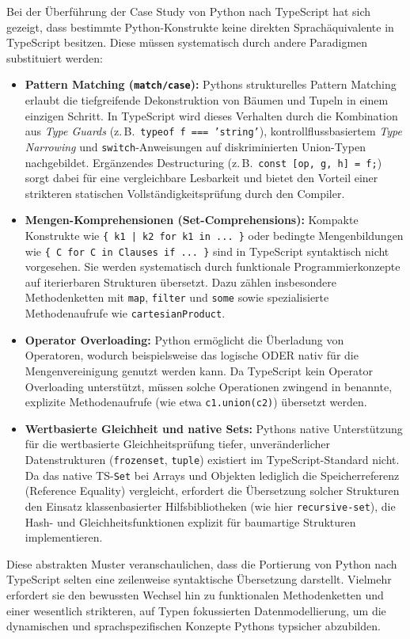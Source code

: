 Bei der Überführung der Case Study von Python nach TypeScript hat sich gezeigt, dass bestimmte Python-Konstrukte keine direkten Sprachäquivalente in TypeScript besitzen. Diese müssen systematisch durch andere Paradigmen substituiert werden:

\begin{itemize}
	\item \textbf{Pattern Matching (\texttt{match/case}):} Pythons strukturelles Pattern Matching erlaubt die tiefgreifende Dekonstruktion von Bäumen und Tupeln in einem einzigen Schritt. In TypeScript wird dieses Verhalten durch die Kombination aus \textit{Type Guards} (z.\,B.\ \texttt{typeof f === 'string'}), kontrollflussbasiertem \textit{Type Narrowing} und \texttt{switch}-Anweisungen auf diskriminierten Union-Typen nachgebildet. Ergänzendes Destructuring (z.\,B.\ \texttt{const [op, g, h] = f;}) sorgt dabei für eine vergleichbare Lesbarkeit und bietet den Vorteil einer strikteren statischen Vollständigkeitsprüfung durch den Compiler.
	
	\item \textbf{Mengen-Komprehensionen (Set-Comprehensions):} Kompakte Konstrukte wie \texttt{\{ k1 | k2 for k1 in ... \}} oder bedingte Mengenbildungen wie \texttt{\{ C for C in Clauses if ... \}} sind in TypeScript syntaktisch nicht vorgesehen. Sie werden systematisch durch funktionale Programmierkonzepte auf iterierbaren Strukturen übersetzt. Dazu zählen insbesondere Methodenketten mit \texttt{map}, \texttt{filter} und \texttt{some} sowie spezialisierte Methodenaufrufe wie \texttt{cartesianProduct}.
	
	\item \textbf{Operator Overloading:} Python ermöglicht die Überladung von Operatoren, wodurch beispielsweise das logische ODER nativ für die Mengenvereinigung genutzt werden kann. Da TypeScript kein Operator Overloading unterstützt, müssen solche Operationen zwingend in benannte, explizite Methodenaufrufe (wie etwa \texttt{c1.union(c2)}) übersetzt werden.
	
	\item \textbf{Wertbasierte Gleichheit und native Sets:} Pythons native Unterstützung für die wertbasierte Gleichheitsprüfung tiefer, unveränderlicher Datenstrukturen (\texttt{frozenset}, \texttt{tuple}) existiert im TypeScript-Standard nicht. Da das native TS-\texttt{Set} bei Arrays und Objekten lediglich die Speicherreferenz (Reference Equality) vergleicht, erfordert die Übersetzung solcher Strukturen den Einsatz klassenbasierter Hilfsbibliotheken (wie hier \texttt{recursive-set}), die Hash- und Gleichheitsfunktionen explizit für baumartige Strukturen implementieren.
\end{itemize}

Diese abstrakten Muster veranschaulichen, dass die Portierung von Python nach TypeScript selten eine zeilenweise syntaktische Übersetzung darstellt. Vielmehr erfordert sie den bewussten Wechsel hin zu funktionalen Methodenketten und einer wesentlich strikteren, auf Typen fokussierten Datenmodellierung, um die dynamischen und sprachspezifischen Konzepte Pythons typsicher abzubilden.